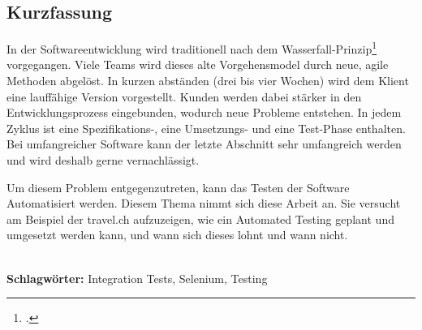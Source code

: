 
\subsection*{Kurzfassung}

In der Softwareentwicklung wird traditionell nach dem Wasserfall-Prinzip\footcite{Wasserfallmodell} vorgegangen. Viele Teams wird dieses alte Vorgehensmodel durch neue, agile Methoden abgelöst. In kurzen abständen (drei bis vier Wochen) wird dem Klient eine lauffähige Version vorgestellt. Kunden werden dabei stärker in den Entwicklungsprozess eingebunden, wodurch neue Probleme entstehen. In jedem Zyklus ist eine Spezifikations-, eine Umsetzungs- und eine Test-Phase enthalten. Bei umfangreicher Software kann der letzte Abschnitt sehr umfangreich werden und wird deshalb gerne vernachlässigt.

Um diesem Problem entgegenzutreten, kann das Testen der Software Automatisiert werden. Diesem Thema nimmt sich diese Arbeit an. Sie versucht am Beispiel der travel.ch aufzuzeigen, wie ein Automated Testing geplant und umgesetzt werden kann, und wann sich dieses lohnt und wann nicht.

%
\mbox{}\\[0.5\baselineskip]\noindent
\textbf{Schlagwörter:} 
Integration Tests, Selenium, Testing
